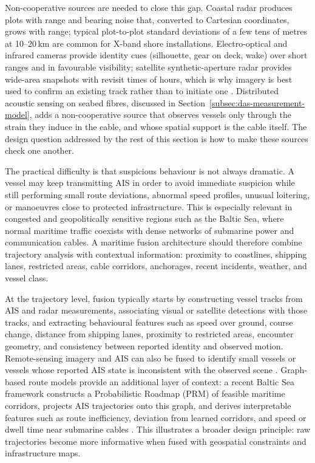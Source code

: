 \documentclass[graybox,envcountchap]{style/SNmono}
\begin{document}
Non-cooperative sources are needed to close this gap. Coastal radar produces plots with range and bearing noise that, converted to Cartesian coordinates, grows with range; typical plot-to-plot standard deviations of a few tens of metres at 10--20\,km are common for X-band shore installations. Electro-optical and infrared cameras provide identity cues (silhouette, gear on deck, wake) over short ranges and in favourable visibility; satellite synthetic-aperture radar provides wide-area snapshots with revisit times of hours, which is why imagery is best used to confirm an existing track rather than to initiate one \cite{chen_sviadf_2025}. Distributed acoustic sensing on seabed fibres, discussed in Section~\ref{subsec:das-measurement-model}, adds a non-cooperative source that observes vessels only through the strain they induce in the cable, and whose spatial support is the cable itself. The design question addressed by the rest of this section is how to make these sources check one another.


The practical difficulty is that suspicious behaviour is not always dramatic. A vessel may keep transmitting AIS in order to avoid immediate suspicion while still performing small route deviations, abnormal speed profiles, unusual loitering, or manoeuvres close to protected infrastructure. This is especially relevant in congested and geopolitically sensitive regions such as the Baltic Sea, where normal maritime traffic coexists with dense networks of submarine power and communication cables. A maritime fusion architecture should therefore combine trajectory analysis with contextual information: proximity to coastlines, shipping lanes, restricted areas, cable corridors, anchorages, recent incidents, weather, and vessel class.

At the trajectory level, fusion typically starts by constructing vessel tracks from AIS and radar measurements, associating visual or satellite detections with those tracks, and extracting behavioural features such as speed over ground, course change, distance from shipping lanes, proximity to restricted areas, encounter geometry, and consistency between reported identity and observed motion. Remote-sensing imagery and AIS can also be fused to identify small vessels or vessels whose reported AIS state is inconsistent with the observed scene \cite{chen_sviadf_2025}. Graph-based route models provide an additional layer of context: a recent Baltic Sea framework constructs a Probabilistic Roadmap (PRM) of feasible maritime corridors, projects AIS trajectories onto this graph, and derives interpretable features such as route inefficiency, deviation from learned corridors, and speed or dwell time near submarine cables \cite{oliva_tomei_prm_access_2026}. This illustrates a broader design principle: raw trajectories become more informative when fused with geospatial constraints and infrastructure maps.
\end{document}
